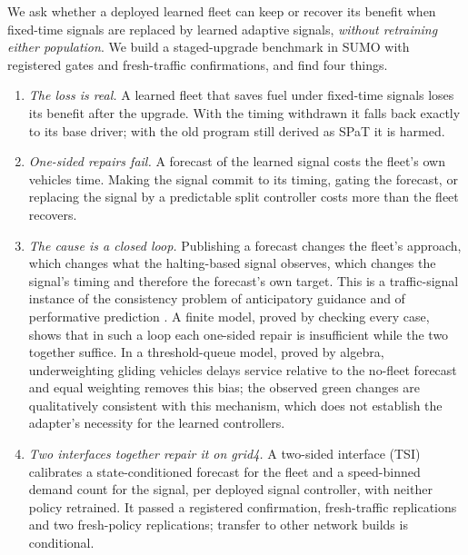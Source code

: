 We ask whether a deployed learned fleet can keep or recover its benefit when fixed-time signals are replaced by learned adaptive signals,
\emph{without retraining either population}. We build a staged-upgrade benchmark in SUMO \cite{lopez2018} with registered gates and
fresh-traffic confirmations, and find four things.
\begin{enumerate}\setlength\itemsep{1pt}
\item \emph{The loss is real.} A learned fleet that saves fuel under fixed-time signals loses its benefit after the upgrade. With the
timing withdrawn it falls back exactly to its base driver; with the old program still derived as SPaT it is harmed.
\item \emph{One-sided repairs fail.} A forecast of the learned signal costs the fleet's own vehicles time. Making the signal commit to
its timing, gating the forecast, or replacing the signal by a predictable split controller costs more than the fleet recovers.
\item \emph{The cause is a closed loop.} Publishing a forecast changes the fleet's approach, which changes what the halting-based signal
observes, which changes the signal's timing and therefore the forecast's own target. This is a traffic-signal instance of the consistency
problem of anticipatory guidance \cite{bottom2000} and of performative prediction \cite{perdomo2020,narang2023}. A finite model, proved by
checking every case, shows that in such a loop each one-sided repair is insufficient while the two together suffice. In a threshold-queue model, proved by algebra, underweighting gliding vehicles delays service relative to the no-fleet forecast and equal weighting removes this bias; the observed green changes are qualitatively consistent with this mechanism, which does not establish the adapter's necessity for the learned controllers.
\item \emph{Two interfaces together repair it on grid4.} A two-sided interface (TSI) calibrates a state-conditioned forecast for
the fleet and a speed-binned demand count for the signal, per deployed signal controller, with neither policy retrained. It passed a
registered confirmation, fresh-traffic replications and two fresh-policy replications; transfer to other network builds is conditional.
\end{enumerate}

